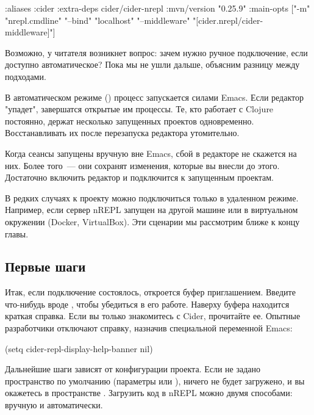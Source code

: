 \begin{english}
  \begin{clojure}
{:aliases
 {:cider
  {:extra-deps
   {cider/cider-nrepl {:mvn/version "0.25.9"}}
   :main-opts
   ["-m" "nrepl.cmdline"
    "--bind" "localhost"
    "--middleware" "[cider.nrepl/cider-middleware]"]}}}
  \end{clojure}
\end{english}

Возможно, у читателя возникнет вопрос: зачем нужно ручное подключение, если доступно автоматическое? Пока мы не ушли дальше, объясним разницу между подходами.

В автоматическом режиме () процесс  запускается силами Emacs. Если редактор "упадет", завершатся открытые им процессы. Те, кто работает с Clojure постоянно, держат несколько запущенных проектов одновременно. Восстанавливать их после перезапуска редактора утомительно.

Когда сеансы запущены вручную вне Emacs, сбой в редакторе не скажется на них. Более того~--- они сохранят изменения, которые вы внесли до этого. Достаточно включить редактор и подключится к запущенным проектам.

В редких случаях к проекту можно подключиться только в удаленном режиме. Например, если сервер nREPL запущен на другой машине или в виртуальном окружении (Docker, VirtualBox). Эти сценарии мы рассмотрим ближе к концу главы.

\subsection{Первые шаги}

Итак, если подключение состоялось, откроется буфер  приглашением. Введите что-нибудь вроде , чтобы убедиться в его работе. Наверху буфера находится краткая справка. Если вы только знакомитесь с Cider, прочитайте ее. Опытные разработчики отключают справку, назначив  специальной переменной Emacs:

\begin{english}
  \begin{lisp}
(setq cider-repl-display-help-banner nil)
  \end{lisp}
\end{english}

Дальнейшие шаги зависят от конфигурации проекта. Если не задано пространство по умолчанию (параметры  или  \arr {}), ничего не будет загружено, и вы окажетесь в пространстве . Загрузить код в nREPL можно двумя способами: вручную и автоматически.

